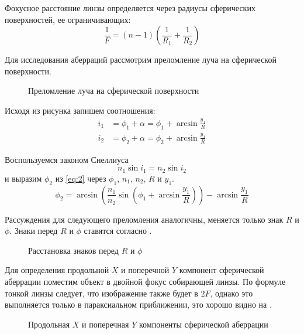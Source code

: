 \documentclass[a4paper, 12pt]{article}
\begin{document}
Фокусное расстояние линзы определяется через радиусы сферических
поверхностей, ее ограничивающих:
\begin{equation}
    \frac{1}{F} = (n-1) \left( \frac{1}{R_1}+ \frac{1}{R_2} \right) 
    \label{eq:1}
\end{equation}

Для исследования аберраций рассмотрим преломление луча на сферической
поверхности.
\begin{figure}[H]
    \def\svgscale{1.1}
    
    \caption{Преломление луча на сферической поверхности}
    \label{fig:2}
\end{figure}

Исходя из рисунка запишем соотношения:
\begin{equation}
    \begin{aligned}
        i_1 &= \phi_1+\alpha = \phi_1 + \arcsin \frac{y_1}{R}\\
        i_2 &= \phi_2+\alpha = \phi_2 + \arcsin \frac{y_1}{R}
    \end{aligned}
    \label{eq:2}
\end{equation}

Воспользуемся законом Снеллиуса
\begin{equation}
    n_1 \sin i_1 = n_2 \sin i_2
    \label{eq:3}
\end{equation}
и выразим $\phi_2$ из \eqref{eq:2} через $\phi_1$, $n_1$, $n_2$, $R$ и
$y_1$.
\begin{equation}
    \phi_2 = \arcsin \left( \frac{n_1}{n_2} \sin \left( \phi_1 +
    \arcsin \frac{y_1}{R} \right) \right) - \arcsin \frac{y_1}{R}
    \label{eq:4}
\end{equation}

Рассуждения для следующего преломления аналогичны, меняется только
знак $R$ и $\phi$. Знаки перед $R$ и $\phi$ ставятся согласно
.
\begin{figure}[H]
    \def\svgscale{0.8}
    
    \caption{Расстановка знаков перед $R$ и $\phi$}
    \label{fig:2a}
\end{figure}


Для определения продольной $X$ и поперечной $Y$ компонент сферической аберрации поместим
объект в двойной фокус собирающей линзы. По формуле тонкой линзы следует, что изображение также
будет в $2F$, однако это выполняется только в параксиальном
приближении, это хорошо видно на .
\begin{figure}[H]
    \def\svgscale{1.3}
    
    \caption{Продольная $X$ и поперечная $Y$ компоненты сферической аберрации}
    \label{fig:3}
\end{figure}
\end{document}
